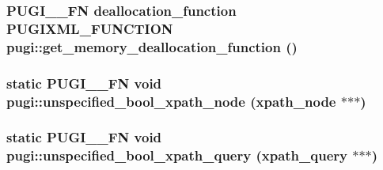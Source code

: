 \hypertarget{namespacepugi_9fcabe4b52fbef0f133fab9ff97652ca}{
\subsubsection[get\_\-memory\_\-deallocation\_\-function]{\setlength{\rightskip}{0pt plus 5cm}PUGI\_\-\_\-FN deallocation\_\-function PUGIXML\_\-FUNCTION pugi::get\_\-memory\_\-deallocation\_\-function ()}}
\label{namespacepugi_9fcabe4b52fbef0f133fab9ff97652ca}


\hypertarget{namespacepugi_bca519e72b848d2ebadf5250727da6c5}{
\subsubsection[unspecified\_\-bool\_\-xpath\_\-node]{\setlength{\rightskip}{0pt plus 5cm}static PUGI\_\-\_\-FN void pugi::unspecified\_\-bool\_\-xpath\_\-node (xpath\_\-node $\ast$$\ast$$\ast$)}}
\label{namespacepugi_bca519e72b848d2ebadf5250727da6c5}


\hypertarget{namespacepugi_41b925609dde7657664cf68c6506838b}{
\subsubsection[unspecified\_\-bool\_\-xpath\_\-query]{\setlength{\rightskip}{0pt plus 5cm}static PUGI\_\-\_\-FN void pugi::unspecified\_\-bool\_\-xpath\_\-query (xpath\_\-query $\ast$$\ast$$\ast$)}}
\label{namespacepugi_41b925609dde7657664cf68c6506838b}


